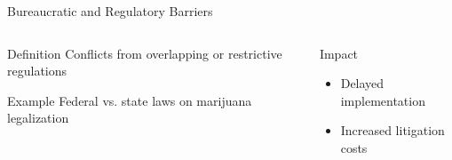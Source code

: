 \documentclass{beamer}
\begin{document}
\begin{frame}{Bureaucratic and Regulatory Barriers}
    \begin{columns}[T]
        \begin{column}{0.6\textwidth}
            \begin{block}{Definition}
                Conflicts from overlapping or restrictive regulations
            \end{block}
            
            \begin{exampleblock}{Example}
                Federal vs. state laws on marijuana legalization
            \end{exampleblock}
        \end{column}
        \begin{column}{0.4\textwidth}
            \begin{alertblock}{Impact}
                \begin{itemize}
                    \item Delayed implementation
                    \item Increased litigation costs
                \end{itemize}
            \end{alertblock}
        \end{column}
    \end{columns}
\end{frame}
\end{document}
